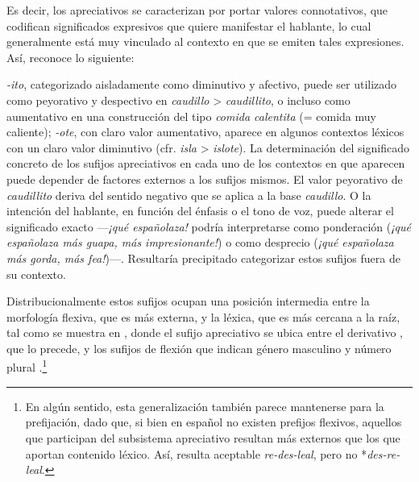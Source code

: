 Es decir, los apreciativos se caracterizan por portar valores connotativos, que
codifican significados expresivos que quiere manifestar el hablante, lo cual
generalmente está muy vinculado al contexto en que se emiten tales expresiones.
Así, \textcite[128]{lang1997} reconoce lo siguiente:

\begin{cita}
\textit{-ito}, categorizado aisladamente como diminutivo y afectivo, puede ser
utilizado como peyorativo y despectivo en \textit{caudillo} >
\textit{caudillito}, o incluso como aumentativo en una construcción del tipo
\textit{comida calentita} (= comida muy caliente); \textit{-ote}, con claro
valor aumentativo, aparece en algunos contextos léxicos con un claro valor
diminutivo (cfr. \textit{isla} > \textit{islote}). La determinación del
significado concreto de los sufijos apreciativos en cada uno de los contextos
en que aparecen puede depender de factores externos a los sufijos mismos. El
valor peyorativo de \textit{caudillito} deriva del sentido negativo que se
aplica a la base \textit{caudillo}. O la intención del hablante, en función del
énfasis o el tono de voz, puede alterar el significado exacto ---\textit{¡qué
españolaza!} podría interpretarse como ponderación (\textit{¡qué españolaza más
guapa, más impresionante!}) o como desprecio (\textit{¡qué españolaza más
gorda, más fea!})---. Resultaría precipitado categorizar estos sufijos fuera de
su contexto.
\end{cita}

Distribucionalmente estos sufijos ocupan una posición intermedia entre la
morfología flexiva, que es más externa, y la léxica, que es más cercana a la
raíz, tal como se muestra en , donde el sufijo apreciativo
 se ubica entre el derivativo , que lo precede, y los
sufijos de flexión que indican género masculino  y número plural
.\footnote{En algún sentido, esta generalización también parece
mantenerse para la prefijación, dado que, si bien en español no existen
prefijos flexivos, aquellos que participan del subsistema apreciativo resultan
más externos que los que aportan contenido léxico. Así, resulta aceptable
\textit{re-des-leal}, pero no *\textit{des-re-leal}.}

